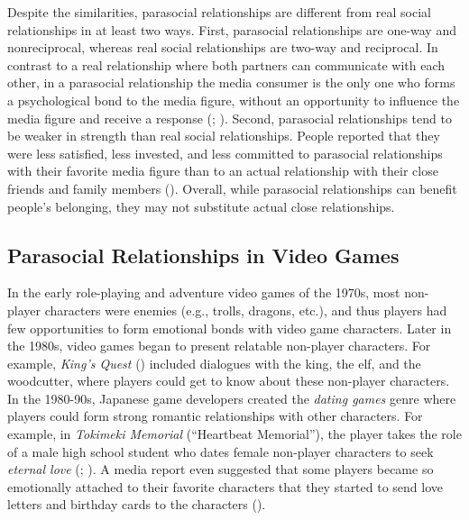 \documentclass[
]{udthesis}
\begin{document}
Despite the similarities, parasocial relationships are different from
real social relationships in at least two ways. First, parasocial
relationships are one-way and nonreciprocal, whereas real social
relationships are two-way and reciprocal. In contrast to a real
relationship where both partners can communicate with each other, in a
parasocial relationship the media consumer is the only one who forms a
psychological bond to the media figure, without an opportunity to
influence the media figure and receive a response (; ). Second, parasocial relationships tend to be weaker in
strength than real social relationships. People reported that they were
less satisfied, less invested, and less committed to parasocial
relationships with their favorite media figure than to an actual
relationship with their close friends and family members ().
Overall, while parasocial relationships can benefit people's belonging,
they may not substitute actual close relationships.

\subsection{Parasocial Relationships in Video Games}\label{parasocial-relationships-in-video-games}

In the early role-playing and adventure video games of the 1970s, most
non-player characters were enemies (e.g., trolls, dragons, etc.), and
thus players had few opportunities to form emotional bonds with video
game characters. Later in the 1980s, video games began to present
relatable non-player characters. For example, \emph{King's Quest}
() included dialogues with the king, the elf, and the
woodcutter, where players could get to know about these non-player
characters. In the 1980-90s, Japanese game developers created the
\emph{dating games} genre where players could form strong romantic
relationships with other characters. For example, in \emph{Tokimeki Memorial}
(``Heartbeat Memorial''), the player takes the role of a male high school
student who dates female non-player characters to seek \emph{eternal love}
(; ). A media report even suggested that
some players became so emotionally attached to their favorite characters
that they started to send love letters and birthday cards to the
characters ().
\end{document}
